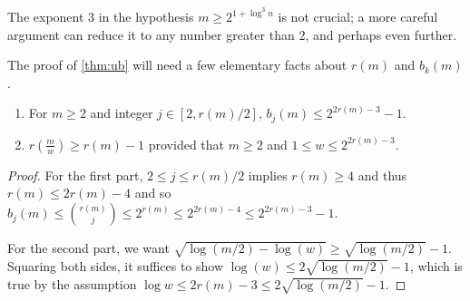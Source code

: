 \documentclass[unicode,review]{siamart1116}
\numberwithin{theorem}{section}
\begin{document}
The exponent 3 in the hypothesis $m\geq 2^{1+\log^3 n}$ is not crucial; a more careful argument can reduce it to any
number greater than 2, and perhaps even further.

The proof of \cref{thm:ub} will need a few elementary facts about $r(m)$ and $b_k(m)$.

\begin{proposition}
\label{prop:technical}
\begin{enumerate}
\item For $m \geq 2$ and integer $j \in [2,r(m)/2]$, $b_j(m) \leq 2^{2r(m)-3}-1$.
\item $r(\frac{m}{w}) \geq r(m)-1$ provided that $m \geq 2$ and $1 \leq w \leq 2^{2r(m)-3}$.
\end{enumerate}
\end{proposition}
\begin{proof}
For the first part, $2 \leq j \leq r(m)/2$ implies $r(m) \geq 4$ and thus
$r(m) \leq 2r(m)-4$ and so $b_j(m) \leq \binom{r(m)}{j} \leq 2^{r(m)} \leq 2^{2r(m)-4} \leq 2^{2r(m)-3}-1$.

For the second part,  we want $\sqrt{\log (m/2) - \log(w)} \geq \sqrt{\log (m/2)} -1$.  Squaring both sides, it suffices to show $\log(w) \leq 2\sqrt{\log(m/2)}-1$,
which is true  by the assumption $\log w \leq 2r(m)-3 \leq 2\sqrt{\log (m/2)}-1$.
\end{proof}
 
\end{document}
